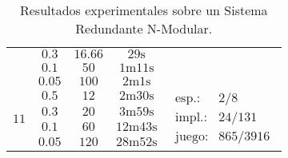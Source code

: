\begin{table}
{\begin{tabular}{c!{\ }|!{\ }c!{\ }|!{\ }c!{\ }|!{\ }c!{\ }|!{\ }c}
      & $0.3$ & $16.66$ & $29\text{s}$ \\
      & $0.1$ & $50$ & $1\text{m}11\text{s}$ \\ 
      & $0.05$ & $100$ & $2\text{m}1\text{s}$ \\ 
       & $0.5$ & $12$ & $2\text{m}30\text{s}$ &  \\ 
      & $0.3$ & $20$ & $3\text{m}59\text{s}$ \\
      & $0.1$ & $60$ & $12\text{m}43\text{s}$ \\ 
      & $0.05$ & $120$ & $28\text{m}52\text{s}$ \\ \hline
    \end{tabular}
    }
    \caption{Resultados experimentales sobre un Sistema Redundante N-Modular.}
    \label{table:resultsNMR}
    \hfill
\end{table}


